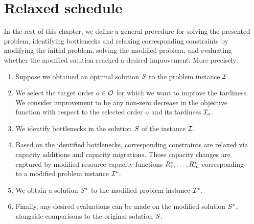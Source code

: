 \section{Relaxed schedule} \label{sec:problem-statement/relaxed-schedule}

In the rest of this chapter, we define a general procedure for solving the presented problem,
identifying bottlenecks and relaxing corresponding constraints by modifying the initial problem,
solving the modified problem,
and evaluating whether the modified solution reached a desired improvement.
More precisely:

\begin{enumerate}
    \item Suppose we obtained an optimal solution $S$ to the problem instance $\mathcal{I}$.

    \item We select the target order $o \in \mathcal{O}$ for which we want to improve the tardiness.
        We consider improvement to be any non-zero decrease in the objective function with respect to the
        selected order $o$ and its tardiness $T_{o}$.

    \item We identify bottlenecks in the solution $S$ of the instance $\mathcal{I}$.

    \item Based on the identified bottlenecks, corresponding constraints are relaxed via
        capacity additions and capacity migrations.
        Those capacity changes are captured by modified resource capacity functions
        $R_{1}^*, \ldots, R_{m}^*$
        corresponding to a modified problem instance $\mathcal{I}^*$.

    \item We obtain a solution $S^*$ to the modified problem instance $\mathcal{I}^*$.

    \item Finally, any desired evaluations can be made on the modified solution $S^*$,
        alongside comparisons to the original solution $S$.
\end{enumerate}
